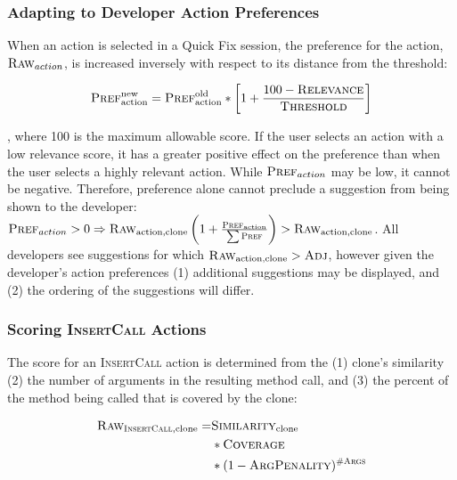 \documentclass[nocopyrightspace,10pt]{sigplanconf}
\begin{document}
\subsubsection{Adapting to Developer Action Preferences}
\label{sec:preference}
When an action is selected in a Quick Fix session, the preference for
the action, $\textsc{Raw}_{action}$, is increased inversely with respect to its
distance from the threshold:

\begin{equation*}
  \textsc{Pref}^{\text{new}}_{\text{action}} = \textsc{Pref}^{\text{old}}_{\text{action}} * \left[ 1 + \frac{100 - \textsc{Relevance}}{\textsc{Threshold}} \right]
\end{equation*}

\noindent, where 100 is the maximum allowable
score. If the user selects an action with a low relevance score, 
it has a greater positive effect on the preference than
when the user selects a highly relevant action.
While $\textsc{Pref}_{action}$ may be low, it cannot be
negative. Therefore, preference alone cannot preclude a suggestion
from being shown to the developer: $\textsc{Pref}_{action} > 0 \Rightarrow
\textsc{Raw}_{\text{action,clone}}\left(1 + \frac{\textsc{Pref}_{\text{action}}}{\sum{\textsc{Pref}}}\right) > \textsc{Raw}_{\text{action,clone}}$.
All developers see suggestions for which $\textsc{Raw}_{\text{action,clone}} > \textsc{Adj}$,
however given the developer's action preferences (1) additional
suggestions may be displayed, and (2) the ordering of the suggestions
will differ.

\subsubsection{Scoring \textsc{InsertCall} Actions}
\label{sec:call}
The score for an \textsc{InsertCall} action is determined
from the (1) clone's similarity (2) the number of arguments in the
resulting method call, and (3) the percent of the method being called
that is covered by the clone:

\begin{align*}
  \textsc{Raw}_{\textsc{InsertCall}, \text{clone}} = & \textsc{Similarity}_{\text{clone}} \\ 
   & * \textsc{Coverage}  \\
   & * (1 - \textsc{ArgPenality})^{\textsc{\#Args}}
\end{align*}
\end{document}
